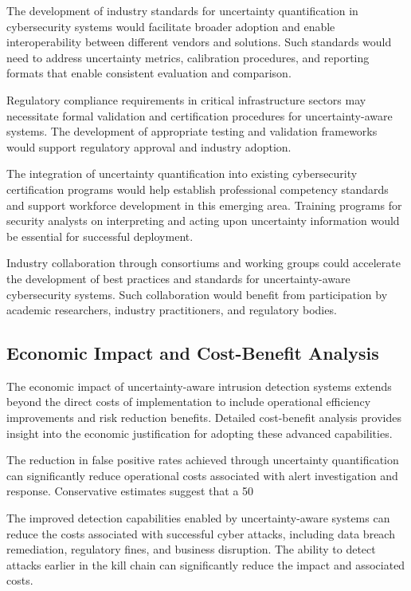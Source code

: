 \documentclass[journal]{IEEEtran}
\begin{document}
The development of industry standards for uncertainty quantification in cybersecurity systems would facilitate broader adoption and enable interoperability between different vendors and solutions. Such standards would need to address uncertainty metrics, calibration procedures, and reporting formats that enable consistent evaluation and comparison.

Regulatory compliance requirements in critical infrastructure sectors may necessitate formal validation and certification procedures for uncertainty-aware systems. The development of appropriate testing and validation frameworks would support regulatory approval and industry adoption.

The integration of uncertainty quantification into existing cybersecurity certification programs would help establish professional competency standards and support workforce development in this emerging area. Training programs for security analysts on interpreting and acting upon uncertainty information would be essential for successful deployment.

Industry collaboration through consortiums and working groups could accelerate the development of best practices and standards for uncertainty-aware cybersecurity systems. Such collaboration would benefit from participation by academic researchers, industry practitioners, and regulatory bodies.

\subsection{Economic Impact and Cost-Benefit Analysis}

The economic impact of uncertainty-aware intrusion detection systems extends beyond the direct costs of implementation to include operational efficiency improvements and risk reduction benefits. Detailed cost-benefit analysis provides insight into the economic justification for adopting these advanced capabilities.

The reduction in false positive rates achieved through uncertainty quantification can significantly reduce operational costs associated with alert investigation and response. Conservative estimates suggest that a 50%

The improved detection capabilities enabled by uncertainty-aware systems can reduce the costs associated with successful cyber attacks, including data breach remediation, regulatory fines, and business disruption. The ability to detect attacks earlier in the kill chain can significantly reduce the impact and associated costs.
\end{document}
